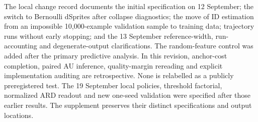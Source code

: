 The local change record documents the initial specification on
12 September; the switch to Bernoulli dSprites after collapse diagnostics;
the move of ID estimation from an impossible 10,000-example validation
sample to training data; trajectory runs without early stopping; and
the 13 September reference-width, run-accounting and degenerate-output
clarifications. The random-feature control was added after the primary
predictive analysis. In this revision, anchor-cost completion, paired AU
inference, quality-margin rereading and explicit implementation auditing
are retrospective. None is relabelled as a publicly preregistered test.
The 19 September local policies, threshold factorial, normalized ARD
readout and new one-seed validation were specified after those earlier
results. The supplement preserves their distinct specifications and
output locations.
